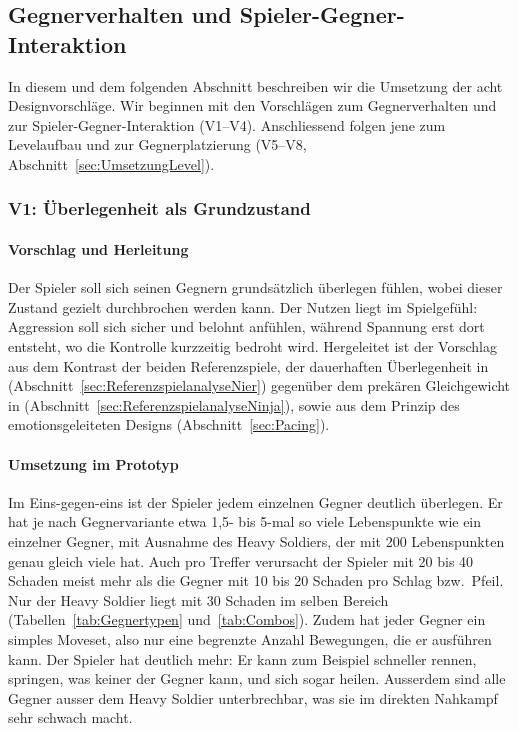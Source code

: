 \documentclass[../Main.tex]{subfiles}
\begin{document}
\subsection{Gegnerverhalten und Spieler-Gegner-Interaktion} \label{sec:UmsetzungGegner}

In diesem und dem folgenden Abschnitt beschreiben wir die Umsetzung der acht Designvorschläge. Wir beginnen mit den Vorschlägen zum Gegnerverhalten und zur Spieler-Gegner-Interaktion (V1--V4). Anschliessend folgen jene zum Levelaufbau und zur Gegnerplatzierung (V5--V8, Abschnitt~\ref{sec:UmsetzungLevel}).

\subsubsection{V1: Überlegenheit als Grundzustand} \label{sec:V1}

\paragraph{Vorschlag und Herleitung}
Der Spieler soll sich seinen Gegnern grundsätzlich überlegen fühlen, wobei dieser Zustand gezielt durchbrochen werden kann. Der Nutzen liegt im Spielgefühl: Aggression soll sich sicher und belohnt anfühlen, während Spannung erst dort entsteht, wo die Kontrolle kurzzeitig bedroht wird. Hergeleitet ist der Vorschlag aus dem Kontrast der beiden Referenzspiele, der dauerhaften Überlegenheit in  (Abschnitt~\ref{sec:ReferenzspielanalyseNier}) gegenüber dem prekären Gleichgewicht in  (Abschnitt~\ref{sec:ReferenzspielanalyseNinja}), sowie aus dem Prinzip des emotionsgeleiteten Designs (Abschnitt~\ref{sec:Pacing}).

\paragraph{Umsetzung im Prototyp}
Im Eins-gegen-eins ist der Spieler jedem einzelnen Gegner deutlich überlegen. Er hat je nach Gegnervariante etwa 1,5- bis 5-mal so viele Lebenspunkte wie ein einzelner Gegner, mit Ausnahme des Heavy Soldiers, der mit 200 Lebenspunkten genau gleich viele hat. Auch pro Treffer verursacht der Spieler mit 20 bis 40 Schaden meist mehr als die Gegner mit 10 bis 20 Schaden pro Schlag bzw.\ Pfeil. Nur der Heavy Soldier liegt mit 30 Schaden im selben Bereich (Tabellen~\ref{tab:Gegnertypen} und~\ref{tab:Combos}). Zudem hat jeder Gegner ein simples Moveset, also nur eine begrenzte Anzahl Bewegungen, die er ausführen kann. Der Spieler hat deutlich mehr: Er kann zum Beispiel schneller rennen, springen, was keiner der Gegner kann, und sich sogar heilen. Ausserdem sind alle Gegner ausser dem Heavy Soldier unterbrechbar, was sie im direkten Nahkampf sehr schwach macht.
\end{document}
